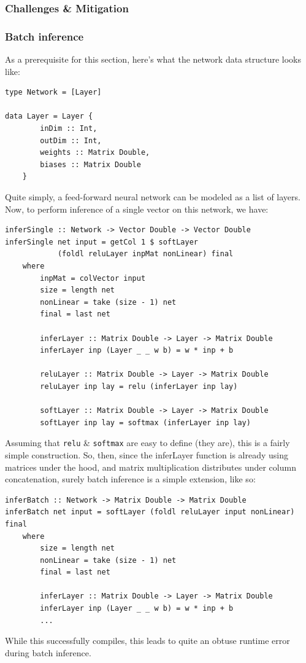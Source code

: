 \documentclass[12pt, titlepage]{article}
\begin{document}
\subsubsection{Challenges \& Mitigation}
\subsubsection{Batch inference}
As a prerequisite for this section, here's what the network data structure looks like:
\begin{lstlisting}
type Network = [Layer]

data Layer = Layer {
		inDim :: Int,
		outDim :: Int,
		weights :: Matrix Double,
		biases :: Matrix Double
	}
\end{lstlisting}
Quite simply, a feed-forward neural network can be modeled as a list of layers. Now, to perform inference of a single vector on this network, we have:
\begin{lstlisting}
inferSingle :: Network -> Vector Double -> Vector Double
inferSingle net input = getCol 1 $ softLayer 
			(foldl reluLayer inpMat nonLinear) final
	where
		inpMat = colVector input
		size = length net
		nonLinear = take (size - 1) net
		final = last net

		inferLayer :: Matrix Double -> Layer -> Matrix Double
		inferLayer inp (Layer _ _ w b) = w * inp + b

		reluLayer :: Matrix Double -> Layer -> Matrix Double
		reluLayer inp lay = relu (inferLayer inp lay)

		softLayer :: Matrix Double -> Layer -> Matrix Double
		softLayer inp lay = softmax (inferLayer inp lay)
\end{lstlisting}
Assuming that \verb|relu| \& \verb|softmax| are easy to define (they are), this is a fairly simple construction. So, then, since the inferLayer function is already using matrices under the hood, and matrix multiplication distributes under column concatenation, surely batch inference is a simple extension, like so:
\begin{lstlisting}
inferBatch :: Network -> Matrix Double -> Matrix Double
inferBatch net input = softLayer (foldl reluLayer input nonLinear) final
	where
		size = length net
		nonLinear = take (size - 1) net
		final = last net

		inferLayer :: Matrix Double -> Layer -> Matrix Double
		inferLayer inp (Layer _ _ w b) = w * inp + b
		...
\end{lstlisting}
While this successfully compiles, this leads to quite an obtuse runtime error during batch inference.\medskip
\end{document}
